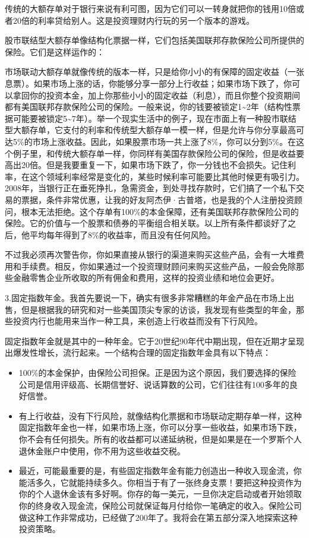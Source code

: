 传统的大额存单对于银行来说有利可图，因为它们可以一转身就把你的钱用10倍或者20倍的利率贷给别人。这是投资理财内行玩的另一个版本的游戏。

股市联结型大额存单像结构化票据一样，它们包括美国联邦存款保险公司所提供的保险。它们是这样运作的：

市场联动大额存单就像传统的版本一样，只是给你小小的有保障的固定收益（一张息票）。如果市场上涨的话，你能够分享一部分上行收益；如果市场下跌了，你可以拿回你的投资本金，加上你那些小小的固定收益（利息），而且你整个投资期间都有美国联邦存款保险公司的保险。一般来说，你的钱要被锁定1\textasciitilde{}2年（结构性票据可能要被锁定5\textasciitilde{}7年）。举一个现实生活中的例子，现在市面上有一种股市联结型大额存单，它支付的利率和传统型大额存单一模一样，但是允许与你分享最高可达5\%的市场上涨收益。因此，如果股票市场一共上涨了8\%，你可以分到5\%。在这个例子里，和传统大额存单一样，你同样有美国存款保险公司的保险，但是收益要高出20倍。但是我要重复一下，如果市场下跌了，你一分钱也不会损失。记住利率，在这个领域利率经常是变化的，某些时候利率可能要比其他时候更有吸引力。2008年，当银行正在垂死挣扎，急需资金，到处寻找存款时，它们搞了一个私下交易的票据，条件非常优惠，让我的好友阿杰伊·古普塔，也是我的个人注册投资顾问，根本无法拒绝。这个存单有100\%的本金保障，还有美国联邦存款保险公司的保险。它的价值与一个股票和债券的平衡组合相关联。以上所有条件都谈好了之后，他平均每年得到了8\%的收益率，而且没有任何风险。

不过我必须再次警告你，你如果直接从银行的渠道来购买这些产品，会有一大堆费用和手续费。相反，你如果通过一个投资理财顾问来购买这些产品，一般会免除那些金融零售企业所收取的所有佣金和费用，这样的投资业绩和地位会更好。

3.固定指数年金。我首先要说一下，确实有很多非常糟糕的年金产品在市场上出售，但是根据我的研究和对一些美国顶尖专家的访谈，我发现有些类型的年金，那些投资内行也能用来当作一种工具，来创造上行收益而没有下行风险。

固定指数年金就是其中的一种年金。它于20世纪90年代中期出现，但在近期才呈现出爆发性增长，流行起来。一个结构合理的固定指数年金具有以下特点：

\begin{itemize}
\item 100\%的本金保护，由保险公司担保。正是因为这个原因，我们要选择的保险公司是信用评级高、长期信誉好、说话算数的公司，它们往往有100多年的良好信誉。
\item 有上行收益，没有下行风险，就像结构化票据和市场联动定期存单一样，这种固定指数年金也一样，如果市场上涨，你可以分享一些收益，如果市场下跌，你不会有任何损失。所有的收益都可以递延纳税，但是如果是在一个罗斯个人退休金账户中使用，你不用为这些收益交税。
\item 最近，可能最重要的是，有些固定指数年金有能力创造出一种收入现金流，你能活多久，它就能持续多久。你相当于有了一张终身支票！要把这种投资作为你的个人退休金该有多好啊。你存的每一美元，一旦你决定启动或者开始领取你的终身收入现金流，保险公司就保证每月付给你一笔确定的收入。保险公司做这种工作非常成功，已经做了200年了。我将会在第五部分深入地探索这种投资策略。
\end{itemize}

